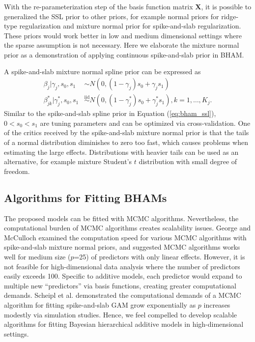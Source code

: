 \documentclass[AMA,STIX1COL,]{WileyNJD-v2}
\begin{document}
With the re-parameterization step of the basis function matrix
\(\boldsymbol{X}\), it is possible to generalized the SSL prior to other
priors, for example normal priors for ridge-type regularization and
mixture normal prior for spike-and-slab regularization. These priors
would work better in low and medium dimensional settings where the
sparse assumption is not necessary. Here we elaborate the mixture normal
prior as a demonstration of applying continuous spike-and-slab prior in
BHAM.

A spike-and-slab mixture normal spline prior can be expressed as
\begin{align*}
  \beta_{j} |\gamma_{j},s_0,s_1 &\sim N(0,(1-\gamma_{j}) s_0 + \gamma_{j} s_1)\\
  \beta^*_{jk} | \gamma^*_{j},s_0,s_1 &\overset{\text{iid}}{\sim}N(0,(1-\gamma^*_{j}) s_0 + \gamma^*_{j} s_1), k=1,\dots, K_j.
\end{align*} Similar to the spike-and-slab spline prior in Equation
(\ref{eq:bham_ssl}), \(0 < s_0 < s_1\) are tuning parameters and can be
optimized via cross-validation. One of the critics received by the
spike-and-slab mixture normal prior is that the tails of a normal
distribution diminishes to zero too fast, which causes problems when
estimating the large effects. Distributions with heavier tails can be
used as an alternative, for example mixture Student's \(t\) distribution
with small degree of freedom.

\hypertarget{algorithms-for-fitting-bhams}{%
\subsection{Algorithms for Fitting
BHAMs}\label{algorithms-for-fitting-bhams}}

The proposed models can be fitted with MCMC algorithms. Nevertheless,
the computational burden of MCMC algorithms creates scalability issues.
George and McCulloch\citep{George1997} examined the computation speed
for various MCMC algorithms with spike-and-slab mixture normal priors,
and suggested MCMC algorithms works well for medium size (\(p\)=25) of
predictors with only linear effects. However, it is not feasible for
high-dimensional data analysis where the number of predictors easily
exceeds 100. Specific to additive models, each predictor would expand to
multiple new ``predictors'' via basis functions, creating greater
computational demands. Scheipl et al. \citep{Scheipl2013} demonstrated
the computational demands of a MCMC algorithm for fitting spike-and-slab
GAM grow exponentially as \(p\) increases modestly via simulation
studies. Hence, we feel compelled to develop scalable algorithms for
fitting Bayesian hierarchical additive models in high-dimensional
settings.
\end{document}

